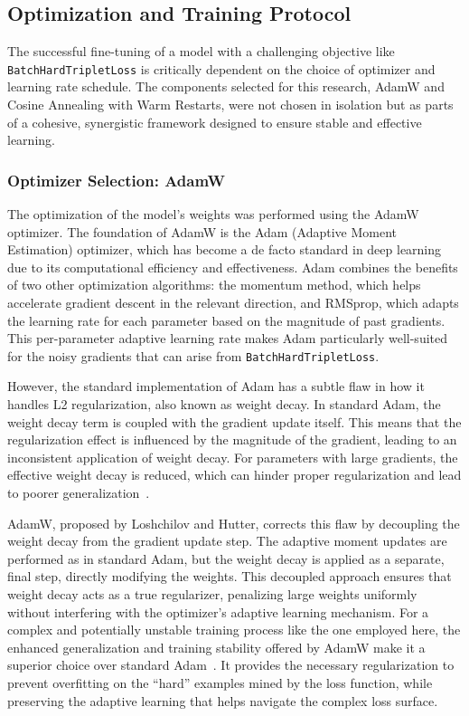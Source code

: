 \subsection{Optimization and Training Protocol}
The successful fine-tuning of a model with a challenging objective like \verb|BatchHardTripletLoss| is critically dependent on the choice of optimizer and learning rate schedule. The components selected for this research, AdamW and Cosine Annealing with Warm Restarts, were not chosen in isolation but as parts of a cohesive, synergistic framework designed to ensure stable and effective learning.{\setlength{\emergencystretch}{5em}\par}

\subsubsection{Optimizer Selection: AdamW}
The optimization of the model's weights was performed using the AdamW optimizer. The foundation of AdamW is the Adam (Adaptive Moment Estimation) optimizer, which has become a de facto standard in deep learning due to its computational efficiency and effectiveness. Adam combines the benefits of two other optimization algorithms: the momentum method, which helps accelerate gradient descent in the relevant direction, and RMSprop, which adapts the learning rate for each parameter based on the magnitude of past gradients. This per-parameter adaptive learning rate makes Adam particularly well-suited for the noisy gradients that can arise from \verb|BatchHardTripletLoss|.

However, the standard implementation of Adam has a subtle flaw in how it handles L2 regularization, also known as weight decay. In standard Adam, the weight decay term is coupled with the gradient update itself. This means that the regularization effect is influenced by the magnitude of the gradient, leading to an inconsistent application of weight decay. For parameters with large gradients, the effective weight decay is reduced, which can hinder proper regularization and lead to poorer generalization~\cite{loshchilov2019decoupledweightdecayregularization}.

AdamW, proposed by Loshchilov and Hutter, corrects this flaw by decoupling the weight decay from the gradient update step. The adaptive moment updates are performed as in standard Adam, but the weight decay is applied as a separate, final step, directly modifying the weights. This decoupled approach ensures that weight decay acts as a true regularizer, penalizing large weights uniformly without interfering with the optimizer's adaptive learning mechanism. For a complex and potentially unstable training process like the one employed here, the enhanced generalization and training stability offered by AdamW make it a superior choice over standard Adam~\cite{loshchilov2019decoupledweightdecayregularization}. It provides the necessary regularization to prevent overfitting on the ``hard'' examples mined by the loss function, while preserving the adaptive learning that helps navigate the complex loss surface.


